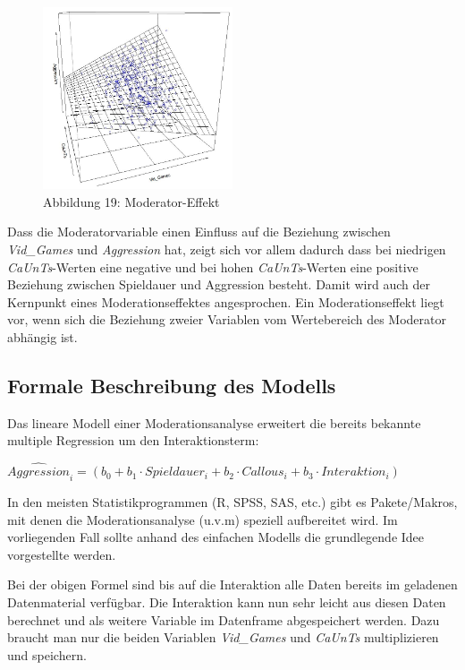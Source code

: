 \documentclass[]{article}
\begin{document}
\begin{figure}
\centering
\includegraphics[width=0.5\textwidth,height=\textheight]{Images/Moderation3DPlot.JPG}
\caption{Abbildung 19: Moderator-Effekt}
\end{figure}

Dass die Moderatorvariable einen Einfluss auf die Beziehung zwischen \emph{Vid\_Games} und \emph{Aggression} hat, zeigt sich vor allem dadurch dass bei niedrigen \emph{CaUnTs}-Werten eine negative und bei hohen \emph{CaUnTs}-Werten eine positive Beziehung zwischen Spieldauer und Aggression besteht. Damit wird auch der Kernpunkt eines Moderationseffektes angesprochen. Ein Moderationseffekt liegt vor, wenn sich die Beziehung zweier Variablen vom Wertebereich des Moderator abhängig ist.

\hypertarget{formale-beschreibung-des-modells}{%
\subsection*{Formale Beschreibung des Modells}\label{formale-beschreibung-des-modells}}

Das lineare Modell einer Moderationsanalyse erweitert die bereits bekannte multiple Regression um den Interaktionsterm:

\(\widehat{Aggression}_i = (b_0 + b_1 \cdot Spieldauer_i + b_2 \cdot Callous_i + b_3 \cdot Interaktion_i)\)

In den meisten Statistikprogrammen (R, SPSS, SAS, etc.) gibt es Pakete/Makros, mit denen die Moderationsanalyse (u.v.m) speziell aufbereitet wird. Im vorliegenden Fall sollte anhand des einfachen Modells die grundlegende Idee vorgestellte werden.

Bei der obigen Formel sind bis auf die Interaktion alle Daten bereits im geladenen Datenmaterial verfügbar. Die Interaktion kann nun sehr leicht aus diesen Daten berechnet und als weitere Variable im Datenframe abgespeichert werden. Dazu braucht man nur die beiden Variablen \emph{Vid\_Games} und \emph{CaUnTs} multiplizieren und speichern.
\end{document}
